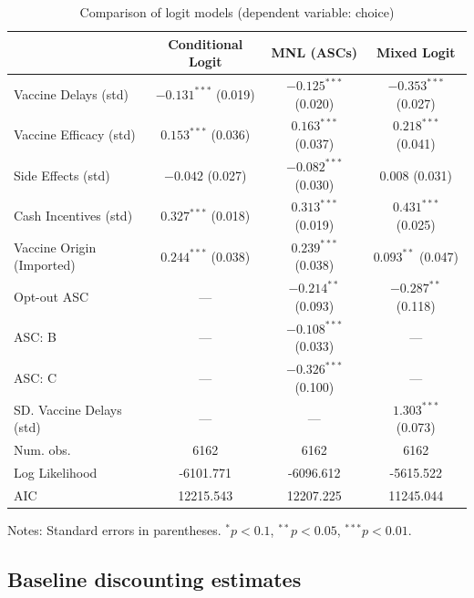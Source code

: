 \documentclass[doublespacing]{utdthesis}
\begin{document}
\begin{table}[!htbp]
\centering
\caption{Comparison of logit models (dependent variable: choice)}
\label{tab:logit_comparison}
\begin{threeparttable}
\setlength{\tabcolsep}{7pt}
\begin{tabular}{lccc}
\toprule
 & Conditional Logit & MNL (ASCs) & Mixed Logit \\
\midrule
Vaccine Delays (std)      & $-0.131^{***}$ (0.019) & $-0.125^{***}$ (0.020) & $-0.353^{***}$ (0.027) \\
Vaccine Efficacy (std)    & $ 0.153^{***}$ (0.036) & $ 0.163^{***}$ (0.037) & $ 0.218^{***}$ (0.041) \\
Side Effects (std)        & $-0.042$      (0.027)  & $-0.082^{***}$ (0.030) & $ 0.008$      (0.031) \\
Cash Incentives (std)     & $ 0.327^{***}$ (0.018) & $ 0.313^{***}$ (0.019) & $ 0.431^{***}$ (0.025) \\
Vaccine Origin (Imported) & $ 0.244^{***}$ (0.038) & $ 0.239^{***}$ (0.038) & $ 0.093^{**}$  (0.047) \\
Opt-out ASC               & ---                   & $-0.214^{**}$ (0.093)  & $-0.287^{**}$ (0.118) \\
ASC: B                    & ---                   & $-0.108^{***}$ (0.033) & --- \\
ASC: C                    & ---                   & $-0.326^{***}$ (0.100) & --- \\
SD. Vaccine Delays (std)  & ---                   & ---                    & $ 1.303^{***}$ (0.073) \\
\midrule
Num. obs.       & 6162 & 6162 & 6162 \\
Log Likelihood  & -6101.771 & -6096.612 & -5615.522 \\
AIC             & 12215.543 & 12207.225 & 11245.044 \\
\bottomrule
\end{tabular}
\begin{tablenotes}[flushleft]
\footnotesize
\item Notes: Standard errors in parentheses. $^{*}p<0.1$, $^{**}p<0.05$, $^{***}p<0.01$.
\end{tablenotes}
\end{threeparttable}
\end{table}



\subsection{Baseline discounting estimates}
\label{subsec:baseline_discounting}
\end{document}
